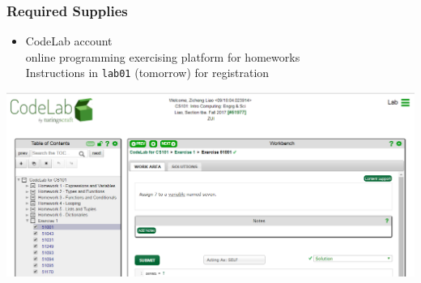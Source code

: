 \documentclass[11pt]{beamer}
\begin{document}
\begin{frame}
  \frametitle{Required Supplies}

  \begin{itemize}
    \item CodeLab account \\ \textcolor{\CSGradBot}{\footnotesize\hspace{1em} online programming exercising platform for homeworks}
    					\\ \textcolor{\CSGradBot}{\footnotesize\hspace{1em} Instructions in \texttt{lab01} (tomorrow) for registration}
  \end{itemize}
  \vspace{2mm}
  \hspace{12mm}\includegraphics[height=0.4\textheight]{./img/codelab.png}
\end{frame}
\end{document}
